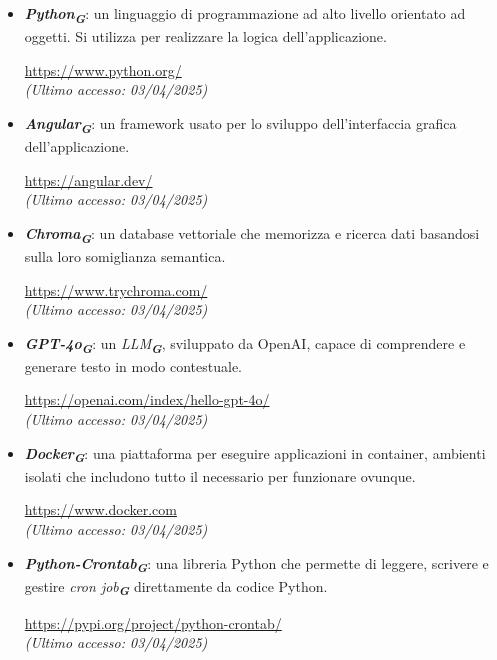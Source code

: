 \label{sec:tecnologie_utilizzate}

\begin{itemize}
    \item \textbf{\emph{Python}\textsubscript{\textit{\textbf{G}}}}: un linguaggio di programmazione ad alto livello orientato ad oggetti. Si
    utilizza per realizzare la logica dell’applicazione.
    \begin{center}
        \url{https://www.python.org/} \\
        \emph{(Ultimo accesso: 03/04/2025)}
    \end{center}

    \item \textbf{\emph{Angular}\textsubscript{\textit{\textbf{G}}}}: un framework usato per lo sviluppo dell’interfaccia grafica dell’applicazione.
    \begin{center}
        \url{https://angular.dev/} \\
        \emph{(Ultimo accesso: 03/04/2025)}
    \end{center}
    
    \item \textbf{\emph{Chroma}\textsubscript{\textit{\textbf{G}}}}: un database vettoriale che memorizza e ricerca dati basandosi sulla loro somiglianza semantica.
    \begin{center}
        \url{https://www.trychroma.com/} \\
        \emph{(Ultimo accesso: 03/04/2025)}
    \end{center}

    \item \textbf{\emph{GPT-4o}\textsubscript{\textit{\textbf{G}}}}: un \emph{LLM}\textsubscript{\textit{\textbf{G}}}, sviluppato da OpenAI, capace di comprendere e generare testo in modo contestuale.
    \begin{center}
        \url{https://openai.com/index/hello-gpt-4o/} \\
        \emph{(Ultimo accesso: 03/04/2025)}
    \end{center}

    \item \textbf{\emph{Docker}\textsubscript{\textit{\textbf{G}}}}: una piattaforma per eseguire applicazioni in container, ambienti isolati che includono tutto il necessario per funzionare ovunque.
    \begin{center}
        \url{https://www.docker.com} \\
        \emph{(Ultimo accesso: 03/04/2025)}
    \end{center}
    
    \item \textbf{\emph{Python-Crontab}\textsubscript{\textit{\textbf{G}}}}: una libreria Python che permette di leggere, scrivere e gestire {\emph{cron job}\textsubscript{\textit{\textbf{G}}}} direttamente da codice Python.
    \begin{center}
        \url{https://pypi.org/project/python-crontab/} \\
        \emph{(Ultimo accesso: 03/04/2025)}
    \end{center}
   
\end{itemize}


